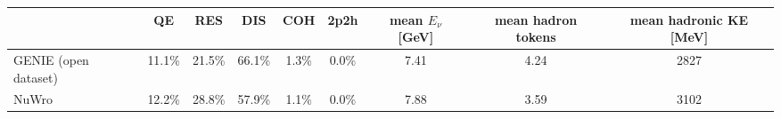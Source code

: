 \begin{tabular}{lcccccccc}
\toprule
 & QE & RES & DIS & COH & 2p2h & mean $E_\nu$ [GeV] & mean hadron tokens & mean hadronic KE [MeV] \\
\midrule
GENIE (open dataset) & 11.1\% & 21.5\% & 66.1\% & 1.3\% & 0.0\% & 7.41 & 4.24 & 2827 \\
NuWro & 12.2\% & 28.8\% & 57.9\% & 1.1\% & 0.0\% & 7.88 & 3.59 & 3102 \\
\bottomrule
\end{tabular}
